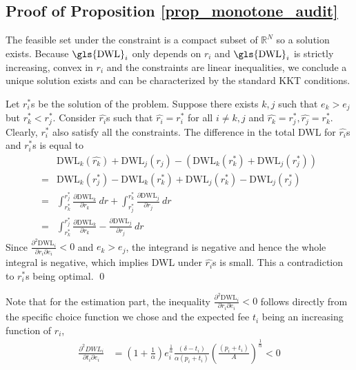 \documentclass[12pt,oneside,letterpaper]{article}
\newlength{\premathenv}
\newlength{\postmathenv}
\theoremstyle{definition}
\renewenvironment{proof}{%
\vspace{\premathenv}%
\noindent{\textit{Proof:} }
}{%
\qed
\vspace{\postmathenv}%
}
\begin{document}
\begin{refsection}
\subsection{Proof of Proposition \autoref{prop_monotone_audit}}
\label{app:audit-policy-proofs-covariates}
\begin{proof}
The feasible set under the constraint is a compact subset of \(\mathbb{R}^N\) so a solution exists.
Because \(\text{\gls{DWL}}_i\) only depends on \(r_i\) and \(\text{\gls{DWL}}_i\) is strictly increasing,
convex in \(r_i\) and the constraints are linear inequalities,
we conclude a unique solution exists and can be characterized by the standard \gls{KKT} conditions.

Let $r^*_i$s be the solution of the problem.
Suppose there exists $k,j$ such that $e_k > e_j$ but $r^*_k < r^*_j$.
Consider $\hat{r_i}$s such that $\hat{r_i} = r^*_i$ for all $i \neq k,j$ and  $\hat{r_k} = r^*_j, \hat{r_j} = r^*_k$.
Clearly, $r^*_i$ also satisfy all the constraints.
The difference in the total \gls{DWL} for $\hat{r_i}$s and $r^*_i$s is equal to
\begin{align*}
&\text{DWL}_k(\hat{r_k}) + \text{DWL}_j(\hat{r_j}) - (\text{DWL}_k(r^*_k) + \text{DWL}_j(r^*_j))\\
= &\text{DWL}_k(r^*_j) - \text{DWL}_k(r^*_k) + \text{DWL}_j(r^*_k) - \text{DWL}_j(r^*_j)\\
= &\int_{r^*_k}^{r^*_j} \frac{\partial \text{DWL}_k}{\partial r_k} \ d r + \int_{r^*_j}^{r^*_k} \frac{\partial \text{DWL}_j}{\partial r_j} \ d r\\
= & \int_{r^*_k}^{r^*_j} \frac{\partial \text{DWL}_k}{\partial r_k} - \frac{\partial \text{DWL}_j}{\partial r_j} \ d r
\end{align*}
Since $\frac{\partial^2 \text{DWL}_i}{\partial r_i \partial e_i} < 0$ and $e_k > e_j$, the integrand is negative and hence the whole integral is negative, which implies \gls{DWL} under $\hat{r_i}$s is small.
This a contradiction to $r^*_i$s being optimal.
\end{proof}

Note that for the estimation part, the inequality \(\frac{\partial^2 \text{DWL}_i}{\partial r_i \partial e_i} < 0\) follows directly from the specific choice function we chose and the expected fee $t_i$ being an increasing function of $r_i$,
    \begin{align*}
        \frac{\partial^2 DWL_i}{\partial t_i \partial e_i} &= (1 + \frac{1}{\alpha}) e^{\frac{1}{\alpha}}_i \frac{(\delta - t_i)}{\alpha (p_i + t_i)} (\frac{(p_i + t_i)}{A})^{\frac{1}{\alpha}} < 0
    \end{align*}

\end{refsection}
\end{document}
